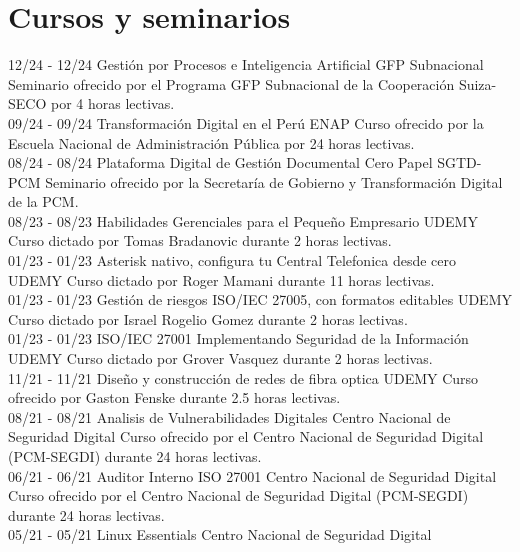 \documentclass[]{friggeri-cv}
\begin{document}
\section{Cursos y seminarios}
\begin{entrylist}
    \entry
    {12/24 - 12/24}
    {Gestión por Procesos e Inteligencia Artificial}
    {GFP Subnacional}
    {Seminario ofrecido por el Programa GFP Subnacional de la Cooperación Suiza-SECO por 4 horas lectivas.\\}
    \entry
    {09/24 - 09/24}
    {Transformación Digital en el Perú}
    {ENAP}
    {Curso ofrecido por la Escuela Nacional de Administración Pública por 24 horas lectivas.\\}
    \entry
    {08/24 - 08/24}
    {Plataforma Digital de Gestión Documental Cero Papel}
    {SGTD-PCM}
    {Seminario ofrecido por la Secretaría de Gobierno y Transformación Digital de la PCM.\\}
    \entry
    {08/23 - 08/23}
    {Habilidades Gerenciales para el Pequeño Empresario}
    {UDEMY}
    {Curso dictado por Tomas Bradanovic durante 2 horas lectivas.\\}
    \entry
    {01/23 - 01/23}
    {Asterisk nativo, configura tu Central Telefonica desde cero}
    {UDEMY}
    {Curso dictado por Roger Mamani durante 11 horas lectivas.\\}
    \entry
    {01/23 - 01/23}
    {Gestión de riesgos ISO/IEC 27005, con formatos editables}
    {UDEMY}
    {Curso dictado por Israel Rogelio Gomez durante 2 horas lectivas.\\}
    \entry
    {01/23 - 01/23}
    {ISO/IEC 27001 Implementando Seguridad de la Información}
    {UDEMY}
    {Curso dictado por Grover Vasquez durante 2 horas lectivas.\\}
    \entry
    {11/21 - 11/21}
    {Diseño y construcción de redes de fibra optica}
    {UDEMY}
    {Curso ofrecido por Gaston Fenske durante 2.5 horas lectivas.\\}
    \entry
    {08/21 - 08/21}
    {Analisis de Vulnerabilidades Digitales}
    {Centro Nacional de Seguridad Digital}
    {Curso ofrecido por el Centro Nacional de Seguridad Digital (PCM-SEGDI) durante 24 horas lectivas.\\}
    \entry
    {06/21 - 06/21}
    {Auditor Interno ISO 27001}
    {Centro Nacional de Seguridad Digital}
    {Curso ofrecido por el Centro Nacional de Seguridad Digital (PCM-SEGDI) durante 24 horas lectivas.\\}
    \entry
    {05/21 - 05/21}
    {Linux Essentials}
    {Centro Nacional de Seguridad Digital}

\end{entrylist}
\end{document}
